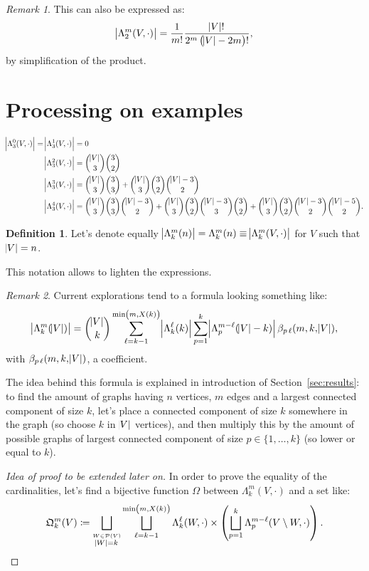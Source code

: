 \documentclass{article}
\theoremstyle{definition}
\newtheorem{definition}[lemma]{Definition}
\theoremstyle{remark}
\newtheorem*{remark}{Remark}
\begin{document}
			\begin{remark} This can also be expressed as:
			\[\abs {\Lambda_2^m(V, \cdot)} = \frac 1{m!}\frac {\abs V!}{2^m\left(\abs V-2m\right)!},\]
			by simplification of the product.
			\end{remark}

\section{Processing on examples}
	\begin{align*}
		\abs {\Lambda_3^0(V, \cdot)} = \abs {\Lambda_3^1(V, \cdot)} &= 0 \\
		\abs {\Lambda_3^2(V, \cdot)} &= \binom {\abs V}3\binom 32 \\
		\abs {\Lambda_3^3(V, \cdot)} &= \binom {\abs V}3\binom 33 + \binom {\abs V}3\binom 32\binom {\abs V-3}2 \\
		\abs {\Lambda_3^4(V, \cdot)} &= \binom {\abs V}3\binom 33\binom {\abs V-3}2 + \binom {\abs V}3\binom 32\binom {\abs V-3}3\binom 32 + \binom {\abs V}3\binom 32\binom {\abs V-3}2\binom {\abs V-5}2.
	\end{align*}

	\begin{definition} Let's denote equally $\abs {\Lambda_k^m(n)} = \Lambda_k^m(n) \equiv \abs {\Lambda_k^m(V, \cdot)}$ for $V$ such that $\abs V = n$.
	\end{definition}

	This notation allows to lighten the expressions.

	\begin{remark} Current explorations tend to a formula looking something like:
	\[\abs {\Lambda_k^m(\abs V)}
		= \binom {\abs V}k\sum_{\ell=k-1}^{\min\left(m, X(k)\right)}\abs {\Lambda_k^\ell(k)}\sum_{p=1}^k\abs {\Lambda_p^{m-\ell}(\abs V-k)}\beta_{p\,\ell}(m, k, \abs V),\]
	with $\beta_{p\,\ell}(m, k, \abs V)$, a coefficient.

	The idea behind this formula is explained in introduction of Section~\ref{sec:results}: to find the amount of graphs having $n$ vertices, $m$ edges
	and a largest connected component of size $k$, let's place a connected component of size $k$ somewhere in the graph (so choose $k$ in $\abs V$ vertices), and then multiply this
	by the amount of possible graphs of largest connected component of size $p \in \{1, \ldots, k\}$ (so lower or equal to $k$).
	\end{remark}

	\begin{proof}[Idea of proof to be extended later on] In order to prove the equality of the cardinalities, let's find a bijective function $\Omega$ between
	$\Lambda_k^m(V, \cdot)$ and a set like:
	\[\mathfrak Q_k^m(V) \coloneqq \bigsqcup_{\stackrel {W \in \mathcal P(V)}{\abs W = k}}\bigsqcup_{\ell=k-1}^{\min\left(m, X(k)\right)}
		\Lambda_k^\ell(W, \cdot) \times \left(\bigsqcup_{p=1}^k \Lambda_p^{m-\ell}(V \setminus W, \cdot)\right).\]
	\end{proof}
\end{document}
